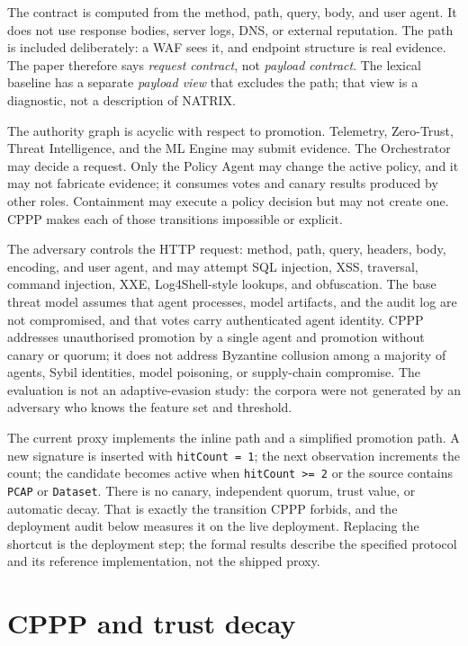 \documentclass[preprint,11pt]{elsarticle}
\begin{document}
The contract is computed from the method, path, query, body, and user
agent. It does not use response bodies, server logs, DNS, or external
reputation. The path is included deliberately: a WAF sees it, and
endpoint structure is real evidence. The paper therefore says
\emph{request contract}, not \emph{payload contract}. The lexical
baseline has a separate \emph{payload view} that excludes the path; that
view is a diagnostic, not a description of NATRIX.

The authority graph is acyclic with respect to promotion. Telemetry,
Zero-Trust, Threat Intelligence, and the ML Engine may submit evidence.
The Orchestrator may decide a request. Only the Policy Agent may change
the active policy, and it may not fabricate evidence; it consumes votes
and canary results produced by other roles. Containment may execute a
policy decision but may not create one. CPPP makes each of those
transitions impossible or explicit.

The adversary controls the HTTP request: method, path, query, headers,
body, encoding, and user agent, and may attempt SQL injection, XSS,
traversal, command injection, XXE, Log4Shell-style lookups, and
obfuscation. The base threat model assumes that agent processes, model
artifacts, and the audit log are not compromised, and that votes carry
authenticated agent identity. CPPP addresses unauthorised promotion by a
single agent and promotion without canary or quorum; it does not address
Byzantine collusion among a majority of agents, Sybil identities, model
poisoning, or supply-chain compromise. The evaluation is not an
adaptive-evasion study: the corpora were not generated by an adversary
who knows the feature set and threshold.

The current proxy implements the inline path and a simplified promotion
path. A new signature is inserted with \texttt{hit\allowbreak{}Count\ =\ 1}; the next
observation increments the count; the candidate becomes active when
\texttt{hitCount\ \textgreater{}=\ 2} or the source contains
\texttt{PCAP} or \texttt{Dataset}. There is no canary, independent
quorum, trust value, or automatic decay. That is exactly the transition
CPPP forbids, and the deployment audit below measures it on the live
deployment. Replacing the shortcut is the deployment step; the formal
results describe the specified protocol and its reference
implementation, not the shipped proxy.

\section{CPPP and trust decay}\label{cppp-and-trust-decay}
\end{document}
